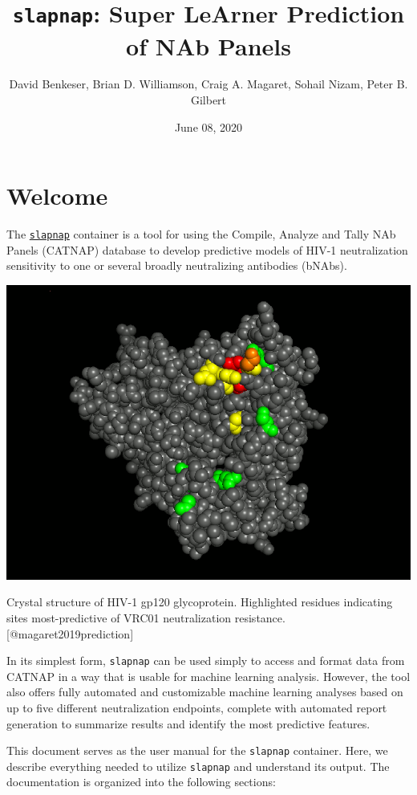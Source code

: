 \documentclass[]{article}
\title{\texttt{slapnap}: Super LeArner Prediction of NAb Panels}
\author{David Benkeser, Brian D. Williamson, Craig A. Magaret, Sohail Nizam,
Peter B. Gilbert}
\date{June 08, 2020}
\begin{document}
\maketitle

{
\setcounter{tocdepth}{2}
\tableofcontents
}
\section*{Welcome}\label{welcome}

The \href{https://hub.docker.com/r/slapnap/slapnap}{\texttt{slapnap}}
container is a tool for using the Compile, Analyze and Tally NAb Panels
(CATNAP) database to develop predictive models of HIV-1 neutralization
sensitivity to one or several broadly neutralizing antibodies (bNAbs).

\begin{center}\includegraphics[width=0.7\linewidth]{gp120} \end{center}\begin{center}
Crystal structure of HIV-1 gp120 glycoprotein. Highlighted residues
indicating sites most-predictive of VRC01 neutralization resistance.
{[}@magaret2019prediction{]}
\end{center}

In its simplest form, \texttt{slapnap} can be used simply to access and
format data from CATNAP in a way that is usable for machine learning
analysis. However, the tool also offers fully automated and customizable
machine learning analyses based on up to five different neutralization
endpoints, complete with automated report generation to summarize
results and identify the most predictive features.

This document serves as the user manual for the \texttt{slapnap}
container. Here, we describe everything needed to utilize
\texttt{slapnap} and understand its output. The documentation is
organized into the following sections:
\end{document}
